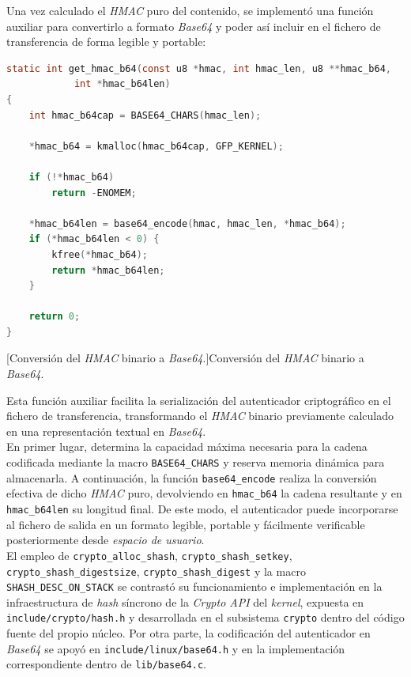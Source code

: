 Una vez calculado el \textit{HMAC} puro del contenido, se implementó una función auxiliar para convertirlo a formato \textit{Base64} y poder así incluir en el fichero de transferencia de forma legible y portable:

\begin{lstlisting}[language=C]
static int get_hmac_b64(const u8 *hmac, int hmac_len, u8 **hmac_b64,
			int *hmac_b64len)
{
	int hmac_b64cap = BASE64_CHARS(hmac_len);

	*hmac_b64 = kmalloc(hmac_b64cap, GFP_KERNEL);

	if (!*hmac_b64)
		return -ENOMEM;

	*hmac_b64len = base64_encode(hmac, hmac_len, *hmac_b64);
	if (*hmac_b64len < 0) {
		kfree(*hmac_b64);
		return *hmac_b64len;
	}

	return 0;
}
\end{lstlisting}
\captionsetup{type=code,justification=centering,singlelinecheck=false}
[Conversión del \textit{HMAC} binario a \textit{Base64}.]{Conversión del \textit{HMAC} binario a \textit{Base64}.}
\label{cod:crypto_get_hmac_b64}
\vspace{\baselineskip}

Esta función auxiliar facilita la serialización del autenticador criptográfico en el fichero de transferencia, transformando el \textit{HMAC} binario previamente calculado en una representación textual en \textit{Base64}.\\

En primer lugar, determina la capacidad máxima necesaria para la cadena codificada mediante la macro \verb|BASE64_CHARS| y reserva memoria dinámica para almacenarla.
A continuación, la función \verb|base64_encode| realiza la conversión efectiva de dicho \textit{HMAC} puro, devolviendo en \verb|hmac_b64| la cadena resultante y en \verb|hmac_b64len| su longitud final.
De este modo, el autenticador puede incorporarse al fichero de salida en un formato legible, portable y fácilmente verificable posteriormente desde \textit{espacio de usuario}.\\

El empleo de \verb|crypto_alloc_shash|, \verb|crypto_shash_setkey|, \verb|crypto_shash_digestsize|, \verb|crypto_shash_digest| y la macro \verb|SHASH_DESC_ON_STACK| se contrastó su funcionamiento e implementación en la infraestructura de \textit{hash} síncrono de la \textit{Crypto API} del \textit{kernel}, expuesta en \texttt{include/crypto/hash.h} y desarrollada en el subsistema \texttt{crypto} dentro del código fuente del propio núcleo.
Por otra parte, la codificación del autenticador en \textit{Base64} se apoyó en \texttt{include/linux/base64.h} y en la implementación correspondiente dentro de \texttt{lib/base64.c}.\\

